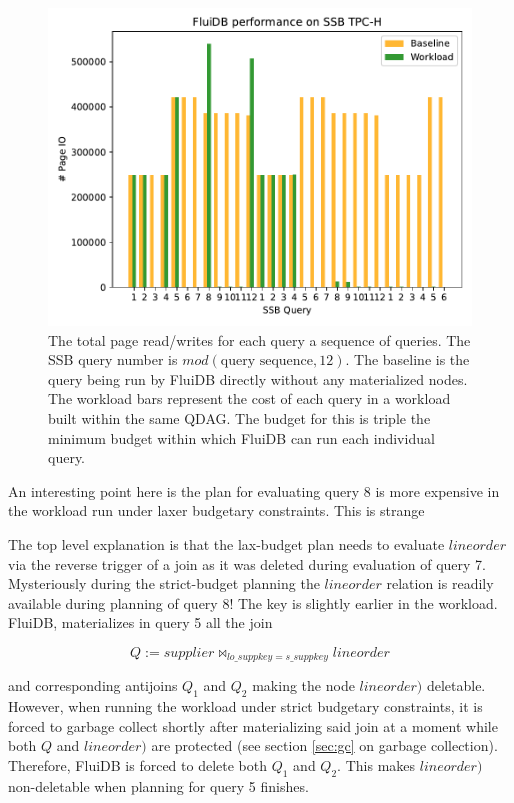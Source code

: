 \begin{figure}[p]
\centering
\includegraphics[width=.9\linewidth]{./plans/io_perf_60000.pdf}

\caption{\label{fig:large_budget_plot}
  The total page read/writes for each query a sequence of queries. The
  SSB query number is \(mod(\text{query sequence},12)\). The baseline
  is the query being run by FluiDB directly without any materialized
  nodes. The workload bars represent the cost of each query in a
  workload built within the same QDAG. The budget for this is triple
  the minimum budget within which FluiDB can run each individual
  query.}
\end{figure}

An interesting point here is the plan for evaluating query 8 is more
expensive in the workload run under laxer budgetary constraints. This is strange

The top level explanation is that the lax-budget plan needs to
evaluate \(\mathit{lineorder}\) via the reverse trigger of a join as
it was deleted during evaluation of query 7. Mysteriously during the
strict-budget planning the \(\mathit{lineorder}\) relation is readily
available during planning of query 8! The key is slightly earlier in
the workload. FluiDB, materializes in query 5 all the join

\[
Q := \mathit{supplier} \Join_{\mathit{lo\_suppkey} = \mathit{s\_suppkey}} \mathit{lineorder}
\]

and corresponding antijoins \(Q_1\) and \(Q_2\) making the node
\(\mathit{lineorder})\) deletable. However, when running the workload
under strict budgetary constraints, it is forced to garbage collect
shortly after materializing said join at a moment while both \(Q\) and
\(\mathit{lineorder})\) are protected (see section \ref{sec:gc} on
garbage collection). Therefore, FluiDB is forced to delete both
\(Q_1\) and \(Q_2\). This makes \(\mathit{lineorder})\) non-deletable
when planning for query 5 finishes.

